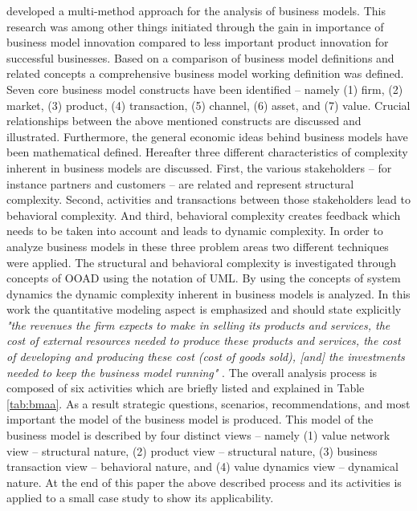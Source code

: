 \citet{Grasl2008} developed a multi-method approach for the analysis of business models. This research was among other things initiated through the gain in importance of business model innovation compared to less important product innovation for successful businesses. Based on a comparison of business model definitions and related concepts a comprehensive business model working definition was defined. Seven core business model constructs have been identified -- namely (1) firm, (2) market, (3) product, (4) transaction, (5) channel, (6) asset, and (7) value. Crucial relationships between the above mentioned constructs are discussed and illustrated. Furthermore, the general economic ideas behind business models have been mathematical defined. Hereafter three different characteristics of complexity inherent in business models are discussed. First, the various stakeholders -- for instance partners and customers -- are related and represent structural complexity. Second, activities and transactions between those stakeholders lead to behavioral complexity. And third, behavioral complexity creates feedback which needs to be taken into account and leads to dynamic complexity. In order to analyze business models in these three problem areas two different techniques were applied. The structural and behavioral complexity is investigated through concepts of \ac{OOAD} using the notation of \ac{UML}. By using the concepts of system dynamics the dynamic complexity inherent in business models is analyzed. In this work the quantitative modeling aspect is emphasized and should state explicitly \textit{"the revenues the firm expects to make in selling its products and services, the cost of external resources needed to produce these products and services, the cost of developing and producing these cost (cost of goods sold), [and] the investments needed to keep the business model running"} \citep[p. 10]{Grasl2008}. The overall analysis process is composed of six activities which are briefly listed and explained in Table \ref{tab:bmaa}. As a result strategic questions, scenarios, recommendations, and most important the model of the business model is produced. This model of the business model is described by four distinct views -- namely (1) value network view -- structural nature, (2) product view -- structural nature, (3) business transaction view -- behavioral nature, and (4) value dynamics view -- dynamical nature. At the end of this paper the above described process and its activities is applied to a small case study to show its applicability.

